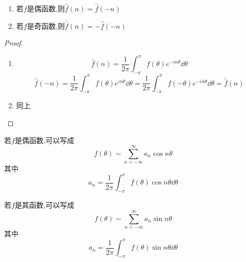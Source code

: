 \begin{proposition}
	\begin{enumerate}
		\item 若$f$是偶函数,则$\widehat{f}(n)=\widehat{f}(-n)$
		\item 若$f$是奇函数,则$\widehat{f}(n)=-\widehat{f}(-n)$
	\end{enumerate}
\end{proposition}
\begin{proof}
	\begin{enumerate}
		\item \[\widehat{f}(n) =\frac{1}{2\pi}\int_{-\pi}^{\pi}f(\theta)e^{-in\theta}\dd \theta\]\[\widehat{f}(-n) =\frac{1}{2\pi}\int_{-\pi}^{\pi}f(\theta)e^{in\theta}\dd \theta=\frac{1}{2\pi}\int_{-\pi}^{\pi}f(-\theta)e^{-in\theta}\dd \theta=\widehat{f}(n)\]
		\item 同上
	\end{enumerate}
\end{proof}
若$f$是偶函数,可以写成
\[f(\theta)\sim \sum_{n=-\infty}^{\infty}a_n\cos n\theta\]
其中\[a_n =\frac{1}{2\pi}\int_{-\pi}^{\pi}f(\theta)\cos n\theta\dd \theta\]

若$f$是其函数,可以写成
\[f(\theta)\sim \sum_{n=-\infty}^{\infty}a_n\sin n\theta\]
其中\[a_n =\frac{1}{2\pi}\int_{-\pi}^{\pi}f(\theta)\sin
 n\theta\dd \theta\]





